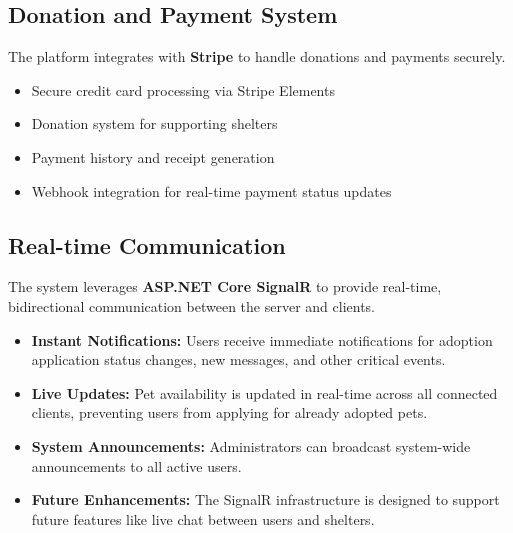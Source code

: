 \documentclass[12pt,a4paper]{article}
\begin{document}
\subsection{Donation and Payment System}

The platform integrates with \textbf{Stripe} to handle donations and payments securely.

\begin{tcolorbox}[colback=lightgray, colframe=primaryblue, title=Key Features]
    \begin{itemize}
        \item Secure credit card processing via Stripe Elements
        \item Donation system for supporting shelters
        \item Payment history and receipt generation
        \item Webhook integration for real-time payment status updates
    \end{itemize}
\end{tcolorbox}

\subsection{Real-time Communication}

The system leverages \textbf{ASP.NET Core SignalR} to provide real-time, bidirectional communication between the server and clients.

\begin{tcolorbox}[colback=lightgray, colframe=primaryblue, title=Use Cases]
    \begin{itemize}
        \item \textbf{Instant Notifications:} Users receive immediate notifications for adoption application status changes, new messages, and other critical events.
        \item \textbf{Live Updates:} Pet availability is updated in real-time across all connected clients, preventing users from applying for already adopted pets.
        \item \textbf{System Announcements:} Administrators can broadcast system-wide announcements to all active users.
        \item \textbf{Future Enhancements:} The SignalR infrastructure is designed to support future features like live chat between users and shelters.
    \end{itemize}
\end{tcolorbox}
\end{document}
